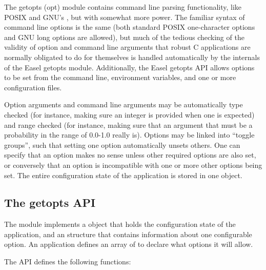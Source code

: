 
The getopts (opt) module contains command line parsing functionality,
like POSIX  and GNU's , but with
somewhat more power. The familiar syntax of command line options is
the same (both standard POSIX one-character options and GNU long
options are allowed), but much of the tedious checking of the validity
of option and command line arguments that robust C applications are
normally obligated to do for themselves is handled automatically by
the internals of the Easel getopts module. Additionally, the Easel
getopts API allows options to be set from the command line,
environment variables, and one or more configuration files.

Option arguments and command line arguments may be automatically type
checked (for instance, making sure an integer is provided when one is
expected) and range checked (for instance, making sure that an
argument that must be a probability in the range of 0.0-1.0 really
is). Options may be linked into ``toggle groups'', such that setting
one option automatically unsets others. One can specify that an option
makes no sense unless other required options are also set, or
conversely that an option is incompatible with one or more other
options being set. The entire configuration state of the application
is stored in one object.

\subsection{The getopts API}

The module implements a  object that holds the
configuration state of the application, and an 
structure that contains information about one configurable option.  An
application defines an array of  to declare what
options it will allow.

The API defines the following functions:

